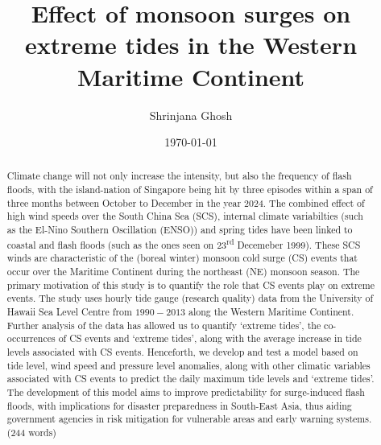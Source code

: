 \documentclass[12pt]{article}
\begin{document}
\title{\vspace{-2.0cm}Effect of monsoon surges on extreme tides in the Western Maritime Continent}
\author{Shrinjana Ghosh}
\date{\today}
\vfill





\maketitle

\begin{abstract}
    Climate change will not only increase the intensity, but also the frequency of flash floods, with the island-nation of Singapore 
    being hit by three episodes within a span of three months between October to December in the year 2024. The combined effect of high
    wind speeds over the South China Sea (SCS), internal climate variabilties (such as the El-Nino Southern Oscillation (ENSO)) and spring tides
    have been linked to coastal and flash floods (such as the ones seen on 23\textsuperscript{rd} Decemeber 1999).
    These SCS winds are characteristic of the (boreal winter) monsoon cold surge (CS) events that 
    occur over the Maritime Continent during the northeast (NE) monsoon season. The primary motivation of this study is to quantify the role that CS events
    play on extreme events. The study uses hourly tide gauge (research quality) data from the University of Hawaii Sea Level Centre from $1990-2013$ along the 
    Western Maritime Continent. Further analysis of the data has allowed us to quantify `extreme tides', the co-occurrences of CS events and `extreme tides', along with the
    average increase in tide levels associated with CS events. Henceforth, we develop and test a model based on tide level, wind speed and pressure level anomalies,
    along with other climatic variables associated with CS events to predict the daily maximum tide levels and `extreme tides'. The development of this model
    aims to improve predictability for surge-induced flash floods, with implications for disaster preparedness in South-East Asia, thus aiding
    government agencies in risk mitigation for vulnerable areas and early warning systems.
    \newline (244 words)
\end{abstract}
\end{document}
